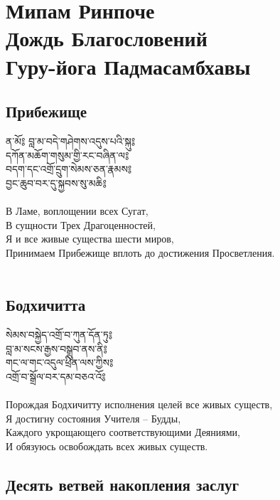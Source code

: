 \normalsize
\section{Мипам Ринпоче\\Дождь Благословений\\Гуру-йога Падмасамбхавы}

\subsection{Прибежище}

\ti
ན་མོ༔ བླ་མ་བདེ་གཤེགས་འདུས་པའི་སྐུ༔\\
དཀོན་མཆོག་གསུམ་གྱི་རང་བཞིན་ལ༔\\
བདག་དང་འགྲོ་དྲུག་སེམས་ཅན་རྣམས༔\\
བྱང་ཆུབ་བར་དུ་སྐྱབས་སུ་མཆི༔\\
\\
\ru
В Ламе, воплощении всех Сугат,\\
В сущности Трех Драгоценностей,\\
Я и все живые существа шести миров,\\
Принимаем Прибежище вплоть до достижения Просветления.\\
\\


\subsection{Бодхичитта}

\ti
སེམས་བསྐྱེད་འགྲོ་བ་ཀུན་དོན་ཏུ༔\\
བླ་མ་སངས་རྒྱས་བསྒྲུབ་ནས་ནི༔\\
གང་ལ་གང་འདུལ་ཕྲིན་ལས་ཀྱིས༔\\
འགྲོ་བ་སྒྲོལ་བར་དམ་བཅའ་འོ༔\\
\\
\ru
Порождая Бодхичитту исполнения целей все живых существ,\\
Я достигну состояния Учителя – Будды,\\
Каждого укрощающего соответствующими Деяниями,\\
И обязуюсь освобождать всех живых существ.\\

\newpage
\subsection{Десять ветвей накопления заслуг}

